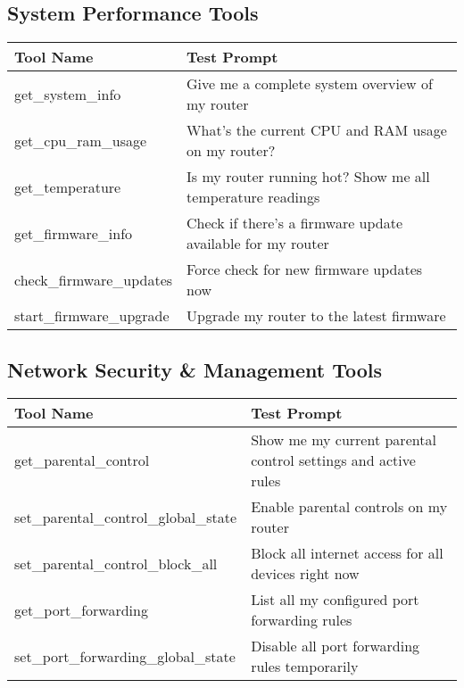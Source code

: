 {\subsection*{System Performance Tools}
\begin{tabular}{|p{6cm}|p{9cm}|}
\hline
\textbf{Tool Name} & \textbf{Test Prompt} \\
\hline
get\_system\_info & Give me a complete system overview of my router \\
\hline
get\_cpu\_ram\_usage & What's the current CPU and RAM usage on my router? \\
\hline
get\_temperature & Is my router running hot? Show me all temperature readings \\
\hline
get\_firmware\_info & Check if there's a firmware update available for my router \\
\hline
check\_firmware\_updates & Force check for new firmware updates now \\
\hline
start\_firmware\_upgrade & Upgrade my router to the latest firmware \\
\hline
\end{tabular}

\subsection*{Network Security \& Management Tools}
\begin{tabular}{|p{6cm}|p{9cm}|}
\hline
\textbf{Tool Name} & \textbf{Test Prompt} \\
\hline
get\_parental\_control & Show me my current parental control settings and active rules \\
\hline
set\_parental\_control\_global\_state & Enable parental controls on my router \\
\hline
set\_parental\_control\_block\_all & Block all internet access for all devices right now \\
\hline
get\_port\_forwarding & List all my configured port forwarding rules \\
\hline
set\_port\_forwarding\_global\_state & Disable all port forwarding rules temporarily \\
\hline
\end{tabular}

}
